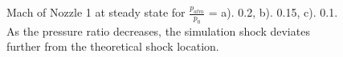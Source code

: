 \documentclass{article}%
\numberwithin{equation}{section}
\begin{document}
\begin{figure}[h!]
\centering
{}
\caption{Mach of Nozzle 1 at steady state for $\frac{p_{atm}}{p_0}$ = a). 0.2, b). 0.15, c). 0.1. As the pressure ratio decreases, the simulation shock deviates further from the theoretical shock location. \label{nozz1shock}}
\end{figure}
\end{document}

